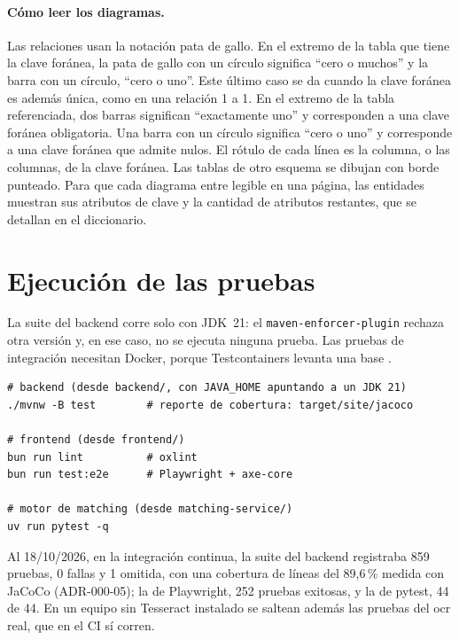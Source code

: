 \paragraph{Cómo leer los diagramas.} Las relaciones usan la notación
pata de gallo. En el extremo de la tabla que tiene la clave foránea, la
pata de gallo con un círculo significa ``cero o muchos'' y la barra con
un círculo, ``cero o uno''. Este último caso se da cuando la clave
foránea es además única, como en una relación 1 a 1. En el extremo de
la tabla referenciada, dos barras significan ``exactamente uno'' y
corresponden a una clave foránea obligatoria. Una barra con un círculo
significa ``cero o uno'' y corresponde a una clave foránea que admite
nulos. El rótulo de cada línea es la columna, o las columnas, de la
clave foránea. Las tablas de otro esquema se dibujan con borde punteado.
Para que cada diagrama entre legible en una página, las entidades
muestran sus atributos de clave y la cantidad de atributos restantes,
que se detallan en el diccionario.



\section{Ejecución de las pruebas}

La suite del backend corre solo con JDK~21: el
\texttt{maven-enforcer-plugin} rechaza otra versión y, en ese caso, no se
ejecuta ninguna prueba. Las pruebas de integración necesitan Docker,
porque Testcontainers levanta una base .

\begin{lstlisting}[caption={Ejecución de las suites}, label={lst:pruebas}]
# backend (desde backend/, con JAVA_HOME apuntando a un JDK 21)
./mvnw -B test        # reporte de cobertura: target/site/jacoco

# frontend (desde frontend/)
bun run lint          # oxlint
bun run test:e2e      # Playwright + axe-core

# motor de matching (desde matching-service/)
uv run pytest -q
\end{lstlisting}

Al 18/10/2026, en la integración continua, la suite del backend
registraba 859 pruebas, 0 fallas y 1 omitida, con una cobertura de
líneas del 89,6\,\% medida con JaCoCo (ADR-000-05); la de Playwright,
252 pruebas exitosas, y la de pytest, 44 de 44. En un equipo sin
Tesseract instalado se saltean además las pruebas del \gls{ocr} real, que
en el CI sí corren.
